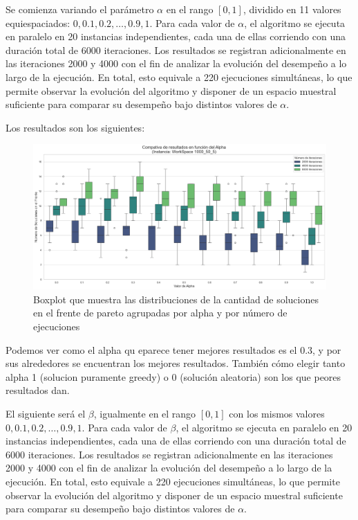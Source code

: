 \documentclass[12pt,a4paper]{book}
\begin{document}
Se comienza variando el parámetro $\alpha$ en el rango $[0,1]$, dividido en 11 valores equiespaciados: $0, 0.1, 0.2, \dots, 0.9, 1$.  
Para cada valor de $\alpha$, el algoritmo se ejecuta en paralelo en 20 instancias independientes, cada una de ellas corriendo con una duración total de 6000 iteraciones. Los resultados se registran adicionalmente en las iteraciones 2000 y 4000 con el fin de analizar la evolución del desempeño a lo largo de la ejecución.
En total, esto equivale a 220 ejecuciones simultáneas, lo que permite observar la evolución del algoritmo y disponer de un espacio muestral suficiente para comparar su desempeño bajo distintos valores de $\alpha$.

Los resultados son los siguientes:

\begin{figure}[H]
    \centering
    \includegraphics[width=\linewidth]{images_finetuning/alpha}
    \caption{Boxplot que muestra las distribuciones de la cantidad de soluciones en el frente de pareto agrupadas por alpha y por número de ejecuciones}
    \label{fig:alpha}
\end{figure}




Podemos ver como el alpha qu eparece tener mejores resultados es el 0.3, y por sus alrededores se encuentran los mejores resultados.
También cómo elegir tanto alpha 1 (solucion puramente greedy) o 0 (solución aleatoria) son los que peores resultados dan.

El siguiente será el $\beta$, igualmente en el rango $[0,1]$ con los mismos valores $0, 0.1, 0.2, \dots, 0.9, 1$.  
Para cada valor de $\beta$, el algoritmo se ejecuta en paralelo en 20 instancias independientes, cada una de ellas corriendo con una duración total de 6000 iteraciones. Los resultados se registran adicionalmente en las iteraciones 2000 y 4000 con el fin de analizar la evolución del desempeño a lo largo de la ejecución.
En total, esto equivale a 220 ejecuciones simultáneas, lo que permite observar la evolución del algoritmo y disponer de un espacio muestral suficiente para comparar su desempeño bajo distintos valores de $\alpha$.
\end{document}
